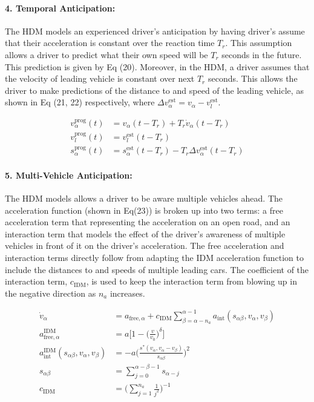 \documentclass[12pt]{article}
\begin{document}
\paragraph{4. Temporal Anticipation:}
The HDM models an experienced driver's anticipation by having driver's assume that their acceleration is constant over the reaction time $T_r$.  This assumption allows a driver to predict what their own speed will be $T_r$ seconds in the future.  This prediction is given by Eq (20).  Moreover, in the HDM, a driver assumes that the velocity of leading vehicle is constant over next $T_r$ seconds.  This allows the driver to make predictions of the distance to and speed of the leading vehicle, as shown in Eq (21, 22) respectively, where $\Delta v_\alpha^\text{est}=v_\alpha-v_l^\text{est}$.
\begin{mymathbox}[ams gather, title=Temporal Anticipation Equations,colframe=blue!30!black]
  \begin{align}
  v_\alpha^{\text{prog}}(t)&=v_\alpha(t-T_r)+T_r\dot v_\alpha(t-T_r)\\
  v_l^{\text{prog}}(t)&=v_l^\text{est}(t-T_r)\\
  s_\alpha^{\text{prog}}(t)&=s_\alpha^\text{est}(t-T_r)-T_r\Delta v_\alpha^\text{est}(t-T_r)
  \end{align}
\end{mymathbox}
\paragraph{5. Multi-Vehicle Anticipation:}
The HDM models allows a driver to be aware multiple vehicles ahead.  The acceleration function (shown in Eq(23)) is broken up into two terms: a free acceleration term that representing the acceleration on an open road, and an interaction term that models the effect of the driver's awareness of multiple vehicles in front of it on the driver's acceleration.  The free acceleration and interaction terms directly follow from adapting the IDM acceleration function to include the distances to and speeds of multiple leading cars.  The coefficient of the interaction term, $c_{\text{IDM}}$, is used to keep the interaction term from blowing up in the negative direction as $n_a$ increases.
\begin{mymathbox}[ams gather, title=Multi-Vehicle Anticipation Equations,colframe=blue!30!black]
  \begin{align}
  \dot v_\alpha &= a_{\text{free},\alpha}+c_{\text{IDM}}\sum_{\beta=\alpha-n_a}^{\alpha-1}a_{\text{int}}(s_{\alpha\beta},v_\alpha,v_\beta)\\
  a^{\text{IDM}}_{\text{free},\alpha}&=a\Bigg[1-\bigg(\frac{v}{v_0}\bigg)^\delta\Bigg]\\
  a^{\text{IDM}}_{\text{int}}(s_{\alpha\beta},v_\alpha,v_\beta)&=-a\Bigg(\frac{s^*(v_\alpha,v_\alpha-v_\beta)}{s_{\alpha\beta}}\Bigg)^2\\
  s_{\alpha\beta}&=\sum_{j=0}^{\alpha-\beta-1}s_{\alpha-j}\\
  c_{\text{IDM}}&=\Bigg(\sum_{j=1}^{n_a}\frac{1}{j^2}\Bigg)^{-1}
  \end{align}
\end{mymathbox}
\end{document}
